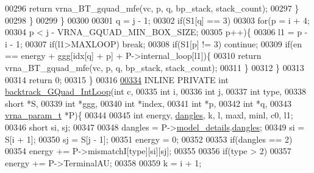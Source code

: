 \begin{DoxyCode}
00296         \textcolor{keywordflow}{return} vrna\_BT\_gquad\_mfe(vc, p, q, bp\_stack, stack\_count);
00297       \}
00298     \}
00299   \}
00300 
00301   q = j - 1;
00302   \textcolor{keywordflow}{if}(S1[q] == 3)
00303     \textcolor{keywordflow}{for}(p = i + 4;
00304         p < j - VRNA\_GQUAD\_MIN\_BOX\_SIZE;
00305         p++)\{
00306       l1    = p - i - 1;
00307       \textcolor{keywordflow}{if}(l1>MAXLOOP) \textcolor{keywordflow}{break};
00308       \textcolor{keywordflow}{if}(S1[p] != 3) \textcolor{keywordflow}{continue};
00309       \textcolor{keywordflow}{if}(en == energy + ggg[idx[q] + p] + P->internal\_loop[l1])\{
00310         \textcolor{keywordflow}{return} vrna\_BT\_gquad\_mfe(vc, p, q, bp\_stack, stack\_count);
00311       \}
00312     \}
00313 
00314   \textcolor{keywordflow}{return} 0;
00315 \}
00316 
\hypertarget{gquad_8h_source.tex_l00334}{}\hyperlink{group__loops_ga220c41e8dbcee940ac975b8ce88e55c5}{00334} INLINE  PRIVATE \textcolor{keywordtype}{int} \hyperlink{group__loops_ga220c41e8dbcee940ac975b8ce88e55c5}{backtrack\_GQuad\_IntLoop}(\textcolor{keywordtype}{int} c,
00335                                             \textcolor{keywordtype}{int} i,
00336                                             \textcolor{keywordtype}{int} j,
00337                                             \textcolor{keywordtype}{int} type,
00338                                             \textcolor{keywordtype}{short} *S,
00339                                             \textcolor{keywordtype}{int} *ggg,
00340                                             \textcolor{keywordtype}{int} *index,
00341                                             \textcolor{keywordtype}{int} *p,
00342                                             \textcolor{keywordtype}{int} *q,
00343                                             \hyperlink{group__energy__parameters_structvrna__param__s}{vrna\_param\_t} *P)\{
00344 
00345   \textcolor{keywordtype}{int} energy, \hyperlink{group__model__details_ga72b511ed1201f7e23ec437e468790d74}{dangles}, k, l, maxl, minl, c0, l1;
00346   \textcolor{keywordtype}{short} si, sj;
00347 
00348   dangles = P->\hyperlink{group__energy__parameters_a7b84353eb9075c595bad4ceb871bcae7}{model\_details}.\hyperlink{group__model__details_adcda4ff2ea77748ae0e8700288282efc}{dangles};
00349   si      = S[i + 1];
00350   sj      = S[j - 1];
00351   energy  = 0;
00352 
00353   \textcolor{keywordflow}{if}(dangles == 2)
00354     energy += P->mismatchI[type][si][sj];
00355 
00356   \textcolor{keywordflow}{if}(type > 2)
00357     energy += P->TerminalAU;
00358 
00359   k = i + 1;

\end{DoxyCode}

